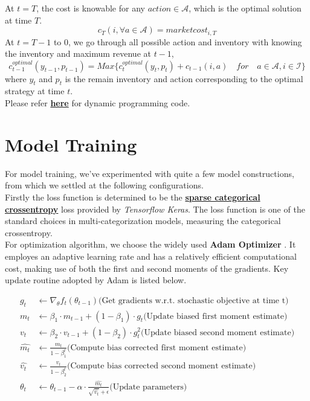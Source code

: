 \documentclass[12pt]{extarticle}
\begin{document}
\noindent At $t = T$, the cost is knowable for any $action\in \mathscr{A}$, which is the optimal solution at time $T$.
$$c_T(i,\forall a\in\mathscr{A}) = market cost_{i,T}$$
At $t = T-1$ to $0$, we go through all possible action and inventory with knowing the inventory and maximum revenue at $t-1$,
$$c_{t-1}^{optimal}(y_{t-1},p_{t-1}) = Max\{c_{t}^{optimal}(y_t,p_t) + c_{t-1}(i,a) \quad for \quad a\in \mathscr{A}, i \in \mathscr{I}\}$$
where $y_t$ and $p_t$ is the remain inventory and action corresponding to the optimal strategy at time $t$.
\\Please refer \href{https://github.com/wangkunzhen/Machine-Learning-5225/blob/master/OptimizationEngine.py}{\textbf{here}} for dynamic programming code.




\section{Model Training}
For model training, we've experimented with quite a few model constructions, from which
we settled at the following configurations.\\


\noindent Firstly the loss function is determined to be the
\href{https://github.com/tensorflow/tensorflow/blob/r1.13/tensorflow/python/keras/backend.py}{\textbf{sparse categorical crossentropy}}
loss provided by \textit{Tensorflow Keras}. The loss function is one of the standard
choices in multi-categorization models, measuring the categorical crossentropy. \\


\noindent For optimization algorithm, we choose the widely used \textbf{Adam Optimizer} \cite{adam}.
It employes an adaptive learning rate and has a relatively efficient computational cost,
making use of both the first and second moments of the gradients. Key update routine
adopted by Adam is listed below.

\begin{equation*}
  \begin{split}
    g_t &\leftarrow \nabla_{\theta} f_t (\theta_{t-1}) \text{(Get gradients w.r.t. stochastic objective at time t)} \\
    m_t &\leftarrow \beta_1 \cdot m_{t-1} + (1-\beta_1) \cdot g_t \text{(Update biased first moment estimate)} \\
    v_t &\leftarrow \beta_2 \cdot v_{t-1} + (1-\beta_2) \cdot g_t^2 \text{(Update biased second moment estimate)} \\
    \hat{m_{t}} &\leftarrow \frac{m_t}{1 - \beta_1^t} \text{(Compute bias corrected first moment estimate)} \\
    \hat{v_{t}} &\leftarrow \frac{v_t}{1 - \beta_2^t} \text{(Compute bias corrected second moment estimate)} \\
    \theta_t &\leftarrow \theta_{t-1} - \alpha \cdot \frac{\hat{m_t}}{\sqrt{\hat{v_t}} + \epsilon} \text{(Update parameters)}
  \end{split}
\end{equation*}
\end{document}

